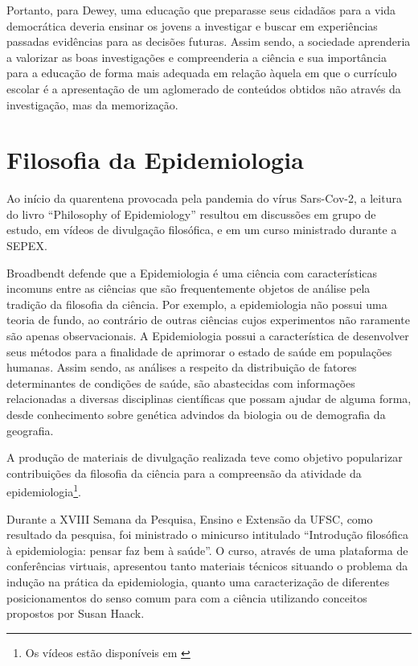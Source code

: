 \documentclass[12pt]{report}
\begin{document}
		Portanto, para Dewey, uma educação que preparasse seus cidadãos para a vida democrática deveria ensinar os jovens a investigar e buscar em experiências passadas evidências para as decisões futuras.
		Assim sendo, a sociedade aprenderia a valorizar as boas investigações e compreenderia a ciência e sua importância para a educação de forma mais adequada em relação àquela em que o currículo escolar é a apresentação de um aglomerado de conteúdos obtidos não através da investigação, mas da memorização.
	
	\section{Filosofia da Epidemiologia}
	
	 	Ao início da quarentena provocada pela pandemia do vírus Sars-Cov-2, a leitura do livro ``Philosophy of Epidemiology'' \cite{broadbent} resultou em discussões em grupo de estudo, em vídeos de divulgação filosófica, e em um curso ministrado durante a SEPEX.
	 	
	 	Broadbendt defende que a Epidemiologia é uma ciência com características incomuns entre as ciências que são frequentemente objetos de análise pela tradição da filosofia da ciência.
		Por exemplo, a epidemiologia não possui uma teoria de fundo, ao contrário de outras ciências cujos experimentos não raramente são apenas observacionais.
		A Epidemiologia possui a característica de desenvolver seus métodos para a finalidade de aprimorar o estado de saúde em populações humanas.
		Assim sendo, as análises a respeito da distribuição de fatores determinantes de condições de saúde, são abastecidas com informações relacionadas a diversas disciplinas científicas que possam ajudar de alguma forma, desde conhecimento sobre genética advindos da biologia ou de demografia da geografia.
	 	
	 	A produção de materiais de divulgação realizada teve como objetivo popularizar contribuições da filosofia da ciência para a compreensão da atividade da epidemiologia\footnote{Os vídeos estão disponíveis em \textcite{youtube}}.
	 	
	 	Durante a XVIII Semana da Pesquisa, Ensino e Extensão da UFSC, como resultado da pesquisa, foi ministrado o minicurso intitulado ``Introdução filosófica à epidemiologia: pensar faz bem à saúde''.
	 	O curso, através de uma plataforma de conferências virtuais, apresentou tanto materiais técnicos situando o problema da indução na prática da epidemiologia, quanto uma caracterização de diferentes posicionamentos do senso comum para com a ciência utilizando conceitos propostos por Susan Haack.
		
\end{document}
